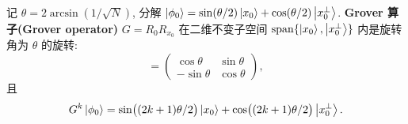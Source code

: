 \documentclass[utf8]{article} %
\numberwithin{equation}{section}   %
\newtheorem{Thm}{\hskip 2em {\color{blue} 定理}}[subsection]
\begin{document}
\begin{Thm}[Grover 迭代] \label{thm:grover}
    记 $\theta = 2\arcsin(1/\sqrt{N})$, 分解
    $\ket{\phi_0} = \sin(\theta/2)\ket{x_0} + \cos(\theta/2)\ket{x_0^\perp}$.
    \textbf{Grover 算子(Grover operator)} $G = R_0 R_{x_0}$ 在二维不变子空间
    $\mathrm{span}\{\ket{x_0}, \ket{x_0^\perp}\}$ 内是旋转角为 $\theta$ 的旋转:
    \begin{equation}
        [G] = \begin{pmatrix} \cos\theta & \sin\theta \\ -\sin\theta & \cos\theta \end{pmatrix},
    \end{equation}
    且
    \begin{equation}
        G^k \ket{\phi_0} = \sin\!\big((2k+1)\theta/2\big)\ket{x_0}
        + \cos\!\big((2k+1)\theta/2\big)\ket{x_0^\perp}.
    \end{equation}
\end{Thm}
\end{document}
